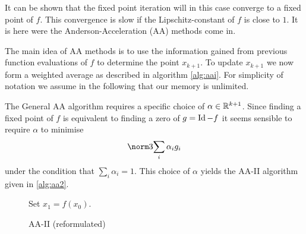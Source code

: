 It can be shown that the fixed point iteration will in this case converge to a fixed point of $f$. This convergence is slow if the Lipschitz-constant of $f$ is close to $1$. It is here were the Anderson-Acceleration (AA) methods come in.

The main idea of AA methods is to use the information gained from previous function evaluations of $f$ to determine the point $x_{k+1}$. To update $x_{k+1}$ we now form a weighted average as described in algorithm \ref{alg:aai}. For simplicity of notation we assume in the following that our memory is unlimited.

The General AA algorithm requires a specific choice of $\alpha\in\mathbb{R}^{k+1}$. Since finding a fixed point of $f$ is equivalent to finding a zero of $g=\operatorname{Id}-f$ it seems sensible to require $\alpha$ to minimise
\begin{align*}
	\norm3{\sum_i\alpha_ig_i}
\end{align*}
under the condition that $\sum_i\alpha_i=1$.
This choice of $\alpha$ yields the AA-II algorithm given in \ref{alg:aa2}.

\begin{figure}
\centering
\begin{algorithm}[H]
\caption{AA-II (reformulated)}
\label{alg:aa2-ref}

\BlankLine
{\black Set $x_1 =f(x_0)$.}

\end{algorithm}
\end{figure}

